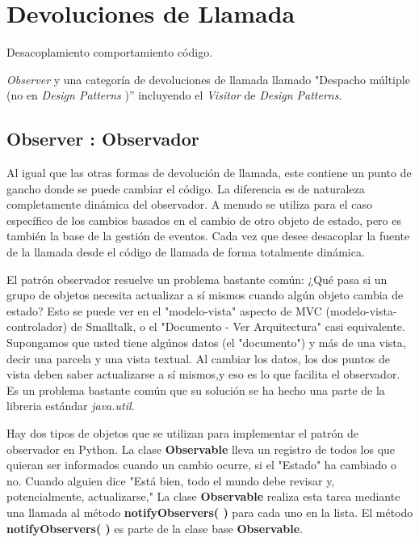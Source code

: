 \documentclass{article}
\begin{document}
\newpage

\section{Devoluciones de Llamada}

Desacoplamiento comportamiento código.  \newline

\textit{Observer} y una categoría de devoluciones de llamada llamado "Despacho múltiple (no en \textit{Design Patterns} )” incluyendo el \textit{Visitor} de \textit{Design Patterns}.   \newline

\subsection{Observer : Observador}

Al igual que las otras formas de devolución de llamada, este contiene un punto de gancho donde se puede cambiar el código. La diferencia es de naturaleza completamente dinámica del observador. A menudo se utiliza para el caso específico de los cambios basados en el cambio de otro objeto de estado, pero es también la base de la gestión de eventos. Cada vez que desee desacoplar la fuente de la llamada desde el código de llamada de forma totalmente dinámica.     \newline

El patrón observador resuelve un problema bastante común: ¿Qué pasa si un grupo de objetos necesita actualizar a sí mismos cuando algún objeto cambia de estado? Esto se puede ver en el "modelo-vista" aspecto de MVC (modelo-vista-controlador) de Smalltalk, o el "Documento - Ver Arquitectura" casi equivalente. Supongamos que usted tiene algúnos datos (el "documento") y más de una vista, decir una parcela y una vista textual. Al cambiar los datos, los dos puntos de vista deben saber actualizarse a sí mismos,y eso es lo que facilita el observador. Es un problema bastante común que su solución se ha hecho una parte de la libreria  estándar \textit{java.util}. \newline

Hay dos tipos de objetos que se utilizan para implementar el patrón de observador en Python. La clase \textbf{Observable} lleva un registro de todos los que quieran ser informados cuando un cambio ocurre, si el "Estado" ha cambiado o no. Cuando alguien dice "Está bien, todo el mundo debe revisar y, potencialmente, actualizarse," La clase \textbf{Observable} realiza esta tarea mediante una llamada al método \textbf{notifyObservers( )} para cada uno en la lista. El método \textbf{notifyObservers( )} es parte de la clase base \textbf{Observable}.   \newline
\end{document}
